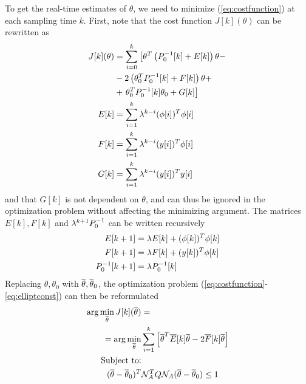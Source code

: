 \par
To get the real-time estimates of $\theta$, we need to minimize
(\ref{eq:costfunction}) at each sampling time $k$. First, note that the
cost function $J[k](\theta)$ can be rewritten as
\begin{equation}
    \begin{split}
        J[k](\theta) &= \sum\limits_{i=0}^k \left[
            \theta^T\left(P_0^{-1}[k] + E[k]\right)\theta - \right.\\
        &- 2\left(\theta_0^TP_0^{-1}[k] + F[k]\right)\theta +\\
        &+\left.\theta_0^TP_0^{-1}[k]\theta_0 + G[k] \right]\\
        E[k] &= \sum\limits_{i=1}^{k} \lambda^{k-i}(\phi[i])^T\phi[i] \\
        F[k] &= \sum\limits_{i=1}^{k} \lambda^{k-i}(y[i])^T\phi[i] \\
        G[k] &= \sum\limits_{i=1}^{k} \lambda^{k-i}(y[i])^Ty[i]
    \end{split}
    \label{eq:EFG}
\end{equation}
and that $G[k]$ is not dependent on $\theta$, and can thus be ignored in the optimization
problem without affecting the minimizing argument. The matrices
$E[k], F[k]$ and $\lambda^{k+1}P_0^{-1}$ can be written recursively
\begin{align}
    E[k+1] &= \lambda E[k] + (\phi[k])^T\phi[k] \label{eq:Erec}\\
    F[k+1] &= \lambda F[k] + (y[k])^T\phi[k] \label{eq:Frec}\\
    P_0^{-1}[k+1] &= \lambda P_0^{-1}[k] \label{eq:Prec}
\end{align}
Replacing $\theta, \theta_0$ with $\overline{\theta}, \overline{\theta}_0$, the optimization problem
(\ref{eq:costfunction}-\ref{eq:elliptconst}) can then be reformulated
\begin{align}
    \arg\min\limits_{\overline{\theta}} J[k](\overline{\theta}) &= \notag
        \\ = \arg\min\limits_{\overline{\theta}} &
            \sum\limits_{i=1}^k \left[\overline{\theta}^T\overline{E}[k]\overline{\theta} - 2\overline{F}[k]\overline{\theta}\right]
            \label{eq:Jconst}\\
    \text{Subject to:}& \notag \\
    (\overline{\theta}-\overline{\theta}_0)^T&\mathcal{N}_A^TQ\mathcal{N}_A(\overline{\theta}-\overline{\theta}_0) \leq 1
    \label{eq:redelliptconst}
\end{align}
